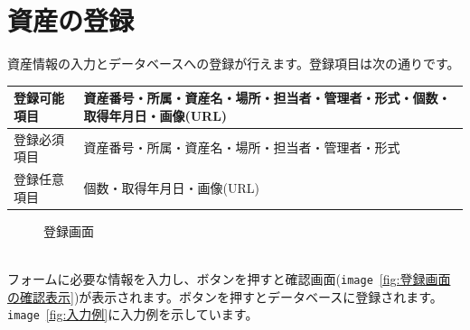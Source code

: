 \documentclass[11ptm]{jsarticle}
\begin{document}
\section{資産の登録}
\label{sec:資産の登録}
資産情報の入力とデータベースへの登録が行えます。登録項目は次の通りです。
\begin{table}[h]
  \centering
  \begin{tabular}{l|l}
    登録可能項目 & 資産番号・所属・資産名・場所・担当者・管理者・形式・個数・取得年月日・画像(URL)
    \\\hline
    登録必須項目 & 資産番号・所属・資産名・場所・担当者・管理者・形式
    \\\hline
    登録任意項目 & 個数・取得年月日・画像(URL)
  \end{tabular}
\end{table}
\begin{figure}[h]
  \centering
  \caption{\label{fig:登録画面}登録画面}
\end{figure}\\
フォームに必要な情報を入力し、ボタンを押すと確認画面({\tt image}\ \ref{fig:登録画面の確認表示})が表示されます。ボタンを押すとデータベースに登録されます。\\
{\tt image}\ \ref{fig:入力例}に入力例を示しています。
\end{document}
